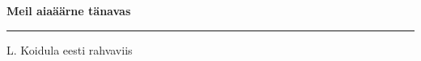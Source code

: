 \documentclass[10pt]{book}
\begin{document}
{
  \samepage
  \raggedbottom
  \raggedright
  \sloppy


  \vspace{0.2in}

  \noindent\begin{minipage}{.1\textwidth}
    \hfill\vspace{0.1in}
  \end{minipage}%
  \noindent\begin{minipage}{.8\textwidth}
    \centering
    \bfseries
    \large Meil aia\"a\"arne t\"anavas
  \end{minipage}%
  \noindent\begin{minipage}{.1\textwidth}
      \hfill\vspace{0.1in}
  \end{minipage}

  \nopagebreak[4]
  \vspace{0.1in}
  \nopagebreak[4]
  \hrule height 0.05ex
  \nopagebreak[4]
  \vspace{-0.05in}

  {\footnotesize L. Koidula \hfill eesti rahvaviis }\\
  \vspace{0.01in}



}
\end{document}

